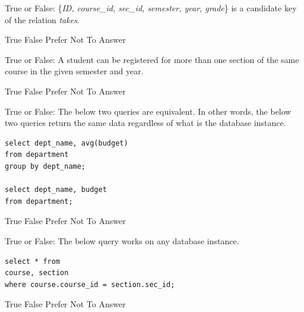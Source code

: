 \documentclass[12pt, addpoints, answers]{exam}
\begin{document}
\begin{questions}
\begin{minipage}{\linewidth}
\question[3]
True or False: \{\textit{ID, course\_id, sec\_id, semester, year, grade}\} is a candidate key of the relation \textit{takes}.\par\vspace{0.5em}
\begin{checkboxes}
    \choice True
    \CorrectChoice False
    \CorrectChoice Prefer Not To Answer
\end{checkboxes}
\end{minipage}\vspace{1em}

\begin{minipage}{\linewidth}
\question[3]
True or False: A student can be registered for more than one section of the same course in the given semester and year.\par\vspace{0.5em}
\begin{checkboxes}
    \CorrectChoice True
    \choice False
    \CorrectChoice Prefer Not To Answer
\end{checkboxes}
\end{minipage}\vspace{1em}

\begin{minipage}{\linewidth}
\question[3]
True or False: The below two queries are equivalent. 
In other words, the below two queries return the same data regardless of what is the database instance.\par\vspace{0.5em}
\begin{verbatim}
select dept_name, avg(budget)
from department
group by dept_name;

select dept_name, budget
from department;
\end{verbatim}
\begin{checkboxes}
    \CorrectChoice True
    \choice False
    \CorrectChoice Prefer Not To Answer
\end{checkboxes}
\end{minipage}\vspace{1em}

\begin{minipage}{\linewidth}
\question[3]
True or False: The below query works on any database instance.\par\vspace{0.5em}
\begin{verbatim}
select * from
course, section
where course.course_id = section.sec_id;
\end{verbatim}
\begin{checkboxes}
    \CorrectChoice True
    \choice False
    \CorrectChoice Prefer Not To Answer
\end{checkboxes}
\end{minipage}\vspace{1em}


\end{questions}
\end{document}
